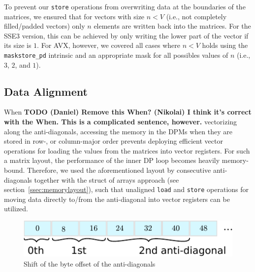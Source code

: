 \documentclass[runningheads,a4paper]{llncs}
\begin{document}
To prevent our \texttt{store} operations from overwriting data at the boundaries
of the matrices, we ensured that for vectors with size $n < V$ (i.e.,
not completely filled/padded vectors) only $n$ elements are written back into the
matrices.  For the SSE3 version, this can be achieved by only writing the lower
part of the vector if its size is $1$.  For AVX, however, we covered all cases
where $n < V$ holds using the \texttt{maskstore\_pd} intrinsic and an appropriate mask
for all possibles values of $n$ (i.e., $3$, $2$, and $1$).

\subsection{Data Alignment}
\label{ssec:dataalignment}

When {\bf TODO (Daniel) Remove this When? (Nikolai) I think it's correct with the When. This is a complicated sentence, however.} vectorizing along the anti-diagonals, accessing the memory in the DPMs when they are stored in row-, or column-major order
prevents deploying efficient vector operations for loading the values from the matrices into vector registers. 
For such a matrix layout, the performance of the inner DP loop becomes heavily memory-bound. 
Therefore, we used the aforementioned layout by consecutive anti-diagonals together with the struct of arrays approach (see section~\ref{ssec:memorylayout}), 
such that unaligned \texttt{load} and \texttt{store} operations for moving data directly to/from the anti-diagonal 
into vector registers can be utilized. 


\begin{figure}[ht!]
  \centering
  \includegraphics[scale=0.9]{figures/unaligned.pdf}
  \caption{Shift of the byte offset of the anti-diagonals}
  \label{fig:unaligned}
\end{figure}
\end{document}
